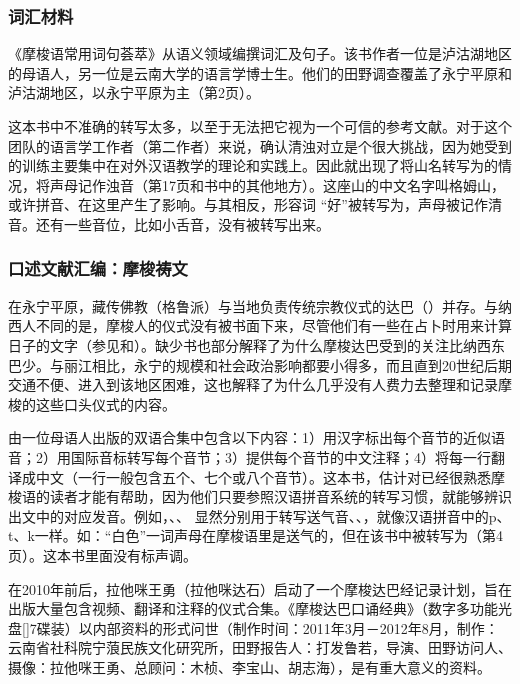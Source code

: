 \subsubsection{词汇材料}
\label{sec:dictionary2013}

《摩梭语常用词句荟萃》\parencite{zhibaetal2013}从语义领域编撰词汇及句子。该书作者一位是泸沽湖地区的母语人，另一位是云南大学的语言学博士生。他们的田野调查覆盖了永宁平原和泸沽湖地区，以永宁平原为主（第2页）。

这本书中不准确的转写太多，以至于无法把它视为一个可信的参考文献。对于这个团队的语言学工作者（第二作者）来说，确认清浊对立是个很大挑战，因为她受到的训练主要集中在对外汉语教学的理论和实践上。因此就出现了将山名转写为的情况，将声母记作浊音（第17页和书中的其他地方）。这座山的中文名字叫格姆山，或许拼音、在这里产生了影响。与其相反，形容词 “好”被转写为，声母被记作清音。还有一些音位，比如小舌音，没有被转写出来。


\subsubsection{口述文献汇编：摩梭祷文}
\label{sec:collectionsoforalliteraturenaritualtexts}
在永宁平原，藏传佛教（格鲁派）与当地负责传统宗教仪式的达巴（）并存。与纳西人不同的是，摩梭人的仪式没有被书面下来，尽管他们有一些在占卜时用来计算日子的文字（参见\textcite{yang1985}和\textcite[163-189]{lidazhu2015}）。缺少书也部分解释了为什么摩梭达巴受到的关注比纳西东巴少。与丽江相比，永宁的规模和社会政治影响都要小得多，而且直到20世纪后期交通不便、进入到该地区困难，这也解释了为什么几乎没有人费力去整理和记录摩梭的这些口头仪式的内容。

由一位母语人出版的双语合集中\parencite{azeming2013}包含以下内容：1）用汉字标出每个音节的近似语音；2）用国际音标转写每个音节；3）提供每个音节的中文注释；4）将每一行翻译成中文（一行一般包含五个、七个或八个音节）。这本书，估计对已经很熟悉摩梭语的读者才能有帮助，因为他们只要参照汉语拼音系统的转写习惯，就能够辨识出文中的对应发音。例如，、、
显然分别用于转写送气音、、，就像汉语拼音中的p、t、k一样。如：“白色”一词声母在摩梭语里是送气的，但在该书中被转写为（第4页）。这本书里面没有标声调。

在2010年前后，拉他咪王勇（拉他咪达石）启动了一个摩梭达巴经记录计划，旨在出版大量包含视频、翻译和注释的仪式合集。《摩梭达巴口诵经典》（数字多功能光盘[]7碟装）以内部资料的形式问世（制作时间：2011年3月－2012年8月，制作：云南省社科院宁蒗民族文化研究所，田野报告人：打发鲁若，导演、田野访问人、摄像：拉他咪王勇、总顾问：木桢、李宝山、胡志海），是有重大意义的资料。


